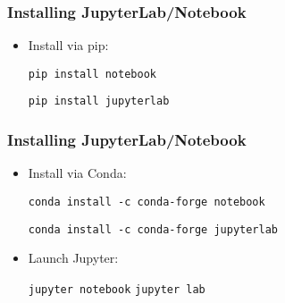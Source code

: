\documentclass{beamer}
\begin{document}
\begin{frame}
    \frametitle{Installing JupyterLab/Notebook}
    \begin{itemize}
        \item Install via pip:
        \begin{tcolorbox}[colback=lightblue, colframe=darkblue, title=Install Jupyter Notebook]
            \lstinline|pip install notebook| 
        \end{tcolorbox}
        \begin{tcolorbox}[colback=lightblue, colframe=darkblue, title=Install JupyterLab]
            \lstinline|pip install jupyterlab| 
        \end{tcolorbox}
        
    \end{itemize}
\end{frame}


\begin{frame}
    \frametitle{Installing JupyterLab/Notebook}
    \begin{itemize}
    \item Install via Conda:
            \begin{tcolorbox}[colback=lightblue, colframe=darkblue, title=Install Jupyter Notebook]
                \lstinline|conda install -c conda-forge notebook| 
            \end{tcolorbox}
            \begin{tcolorbox}[colback=lightblue, colframe=darkblue, title=Install JupyterLab]
                \lstinline|conda install -c conda-forge jupyterlab| 
            \end{tcolorbox}
            \item Launch Jupyter:
            \begin{tcolorbox}[colback=lightblue, colframe=darkblue, title=Launch Jupyter]
                \lstinline|jupyter notebook|  \lstinline|jupyter lab|
            \end{tcolorbox}
    \end{itemize}
\end{frame}
\end{document}
